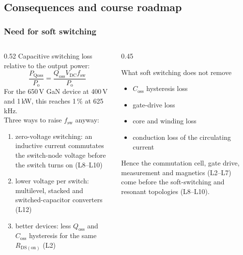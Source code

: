 \subsection{Consequences and course roadmap}

\begin{frame}
	\frametitle{Need for soft switching}
	\begin{columns}[T]
		\begin{column}{0.52\textwidth}
			Capacitive switching loss relative to the output power:
			\begin{equation*}
				\frac{P_\mathrm{Qoss}}{P_\mathrm{o}}=\frac{Q_\mathrm{oss}V_\mathrm{DC}f_\mathrm{sw}}{P_\mathrm{o}}
			\end{equation*}
			For the 650\,V GaN device at 400\,V and 1\,kW, this reaches 1\,\% at 625\,kHz.\\[0.2em]
			Three ways to raise $f_\mathrm{sw}$ anyway:
			\begin{enumerate}
				\item zero-voltage switching: an inductive current commutates the switch-node voltage before the switch turns on (L8--L10)
				\item lower voltage per switch: multilevel, stacked and switched-capacitor converters (L12)
				\item better devices: less $Q_\mathrm{oss}$ and $C_\mathrm{oss}$ hysteresis for the same $R_\mathrm{DS(on)}$ (L2)
			\end{enumerate}
		\end{column}
		\begin{column}{0.45\textwidth}
			\begin{block}{What soft switching does not remove}
				\begin{itemize}
					\item $C_\mathrm{oss}$ hysteresis loss
					\item gate-drive loss
					\item core and winding loss
					\item conduction loss of the circulating current
				\end{itemize}
			\end{block}
			Hence the commutation cell, gate drive, measurement and magnetics (L2--L7) come before the soft-switching and resonant topologies (L8--L10).
		\end{column}
	\end{columns}
\end{frame}

